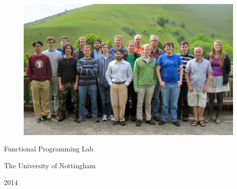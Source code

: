 \documentclass[a4paper]{report}
\begin{document}
\thispagestyle{empty}

\mbox{}
\vspace{3cm}

\begin{center}
\begin{figure}[here]
\centering
\includegraphics[width=12cm]{FP-LAB.jpg}
\end{figure}

Functional Programming Lab

The University of Nottingham

2014

\end{center}

\newpage

\tableofcontents

\newpage

\thispagestyle{empty}
\mbox{}

\newpage
\end{document}
